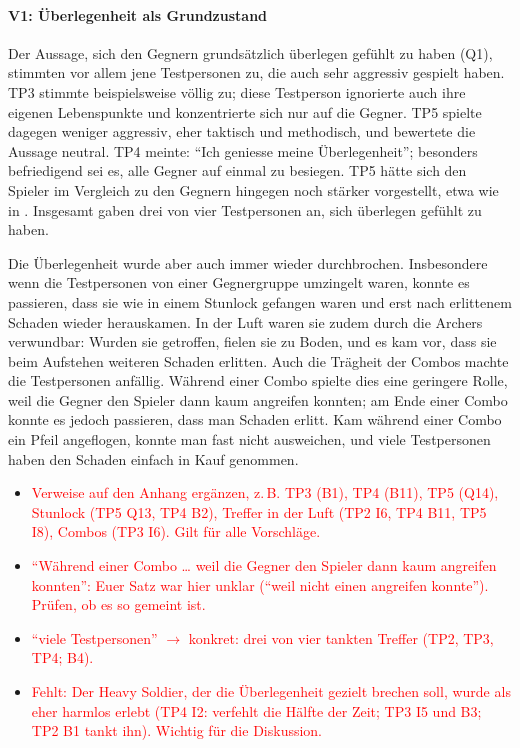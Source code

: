 \documentclass[../Main.tex]{subfiles}
\begin{document}
\paragraph{V1: Überlegenheit als Grundzustand}
Der Aussage, sich den Gegnern grundsätzlich überlegen gefühlt zu haben (Q1), stimmten vor allem jene Testpersonen zu, die auch sehr aggressiv gespielt haben. TP3 stimmte beispielsweise völlig zu; diese Testperson ignorierte auch ihre eigenen Lebenspunkte und konzentrierte sich nur auf die Gegner. TP5 spielte dagegen weniger aggressiv, eher taktisch und methodisch, und bewertete die Aussage neutral. TP4 meinte: \enquote{Ich geniesse meine Überlegenheit}; besonders befriedigend sei es, alle Gegner auf einmal zu besiegen. TP5 hätte sich den Spieler im Vergleich zu den Gegnern hingegen noch stärker vorgestellt, etwa wie in . Insgesamt gaben drei von vier Testpersonen an, sich überlegen gefühlt zu haben.

Die Überlegenheit wurde aber auch immer wieder durchbrochen. Insbesondere wenn die Testpersonen von einer Gegnergruppe umzingelt waren, konnte es passieren, dass sie wie in einem Stunlock gefangen waren und erst nach erlittenem Schaden wieder herauskamen. In der Luft waren sie zudem durch die Archers verwundbar: Wurden sie getroffen, fielen sie zu Boden, und es kam vor, dass sie beim Aufstehen weiteren Schaden erlitten. Auch die Trägheit der Combos machte die Testpersonen anfällig. Während einer Combo spielte dies eine geringere Rolle, weil die Gegner den Spieler dann kaum angreifen konnten; am Ende einer Combo konnte es jedoch passieren, dass man Schaden erlitt. Kam während einer Combo ein Pfeil angeflogen, konnte man fast nicht ausweichen, und viele Testpersonen haben den Schaden einfach in Kauf genommen.

\begin{itemize}[leftmargin=1.5cm]
    \item \textcolor{red}{Verweise auf den Anhang ergänzen, z.\,B. TP3 (B1), TP4 (B11), TP5 (Q14), Stunlock (TP5 Q13, TP4 B2), Treffer in der Luft (TP2 I6, TP4 B11, TP5 I8), Combos (TP3 I6). Gilt für alle Vorschläge.}
    \item \textcolor{red}{\enquote{Während einer Combo \ldots{} weil die Gegner den Spieler dann kaum angreifen konnten}: Euer Satz war hier unklar (\enquote{weil nicht einen angreifen konnte}). Prüfen, ob es so gemeint ist.}
    \item \textcolor{red}{\enquote{viele Testpersonen} $\rightarrow$ konkret: drei von vier tankten Treffer (TP2, TP3, TP4; B4).}
    \item \textcolor{red}{Fehlt: Der Heavy Soldier, der die Überlegenheit gezielt brechen soll, wurde als eher harmlos erlebt (TP4 I2: verfehlt die Hälfte der Zeit; TP3 I5 und B3; TP2 B1 tankt ihn). Wichtig für die Diskussion.}
\end{itemize}
\end{document}
